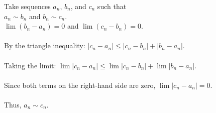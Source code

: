 \documentclass[preview]{standalone}
\begin{document}
\begin{center}
Take sequences $a_n$, $b_n$, and $c_n$ such that\\$a_n \sim b_n$ and $b_n \sim c_n$.\\$\lim (b_n - a_n) = 0$ and $\lim (c_n - b_n) = 0$.\\\\By the triangle inequality: $|c_n - a_n| \leq |c_n - b_n| + |b_n - a_n|$.\\\\Taking the limit: $\lim |c_n - a_n| \leq \lim |c_n - b_n| + \lim |b_n - a_n|$.\\\\Since both terms on the right-hand side are zero, $\lim |c_n - a_n| = 0$.\\\\Thus, $a_n \sim c_n$.
\end{center}
\end{document}
